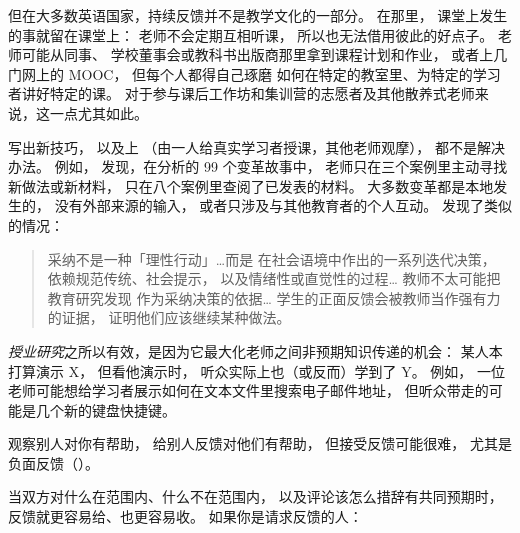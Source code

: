 但在大多数英语国家，持续反馈并不是教学文化的一部分。
在那里，
课堂上发生的事就留在课堂上：
老师不会定期互相听课，
所以也无法借用彼此的好点子。
老师可能从同事、
学校董事会或教科书出版商那里拿到课程计划和作业，
或者上几门网上的 MOOC，
但每个人都得自己琢磨
如何在特定的教室里、为特定的学习者讲好特定的课。
对于参与课后工作坊和集训营的志愿者及其他散养式老师来说，这一点尤其如此。

写出新技巧，
以及上
（由一人给真实学习者授课，其他老师观摩），
都不是解决办法。
例如，
\cite{Finc2007,Finc2012}发现，在分析的 99 个变革故事中，
老师只在三个案例里主动寻找新做法或新材料，
只在八个案例里查阅了已发表的材料。
大多数变革都是本地发生的，
没有外部来源的输入，
或者只涉及与其他教育者的个人互动。
\cite{Bark2015}发现了类似的情况：

\begin{quote}

  采纳不是一种「理性行动」{\ldots}而是
  在社会语境中作出的一系列迭代决策，
  依赖规范传统、社会提示，
  以及情绪性或直觉性的过程{\ldots}
  教师不太可能把教育研究发现
  作为采纳决策的依据{\ldots}
  学生的正面反馈会被教师当作强有力的证据，
  证明他们应该继续某种做法。

\end{quote}

\emph{授业研究}之所以有效，是因为它最大化老师之间非预期知识传递的机会：
某人本打算演示 X，
但看他演示时，
听众实际上也（或反而）学到了 Y。
例如，
一位老师可能想给学习者展示如何在文本文件里搜索电子邮件地址，
但听众带走的可能是几个新的键盘快捷键。


观察别人对你有帮助，
给别人反馈对他们有帮助，
但接受反馈可能很难，
尤其是负面反馈（）。


当双方对什么在范围内、什么不在范围内，
以及评论该怎么措辞有共同预期时，
反馈就更容易给、也更容易收。
如果你是请求反馈的人：

